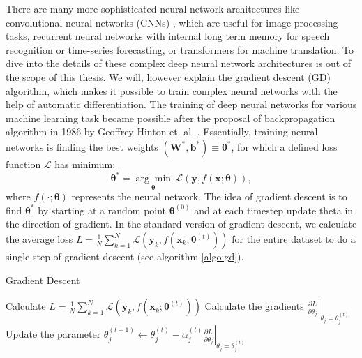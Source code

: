 \documentclass[12pt, a4paper,  nobibnotes]{article}
\begin{document}
There are many more sophisticated neural network architectures like convolutional neural networks (CNNs)
\cite{LeCun-CNN}, which are useful for image processing tasks, recurrent neural networks 
with internal long term memory \cite{SchmidhuberLSTM} for speech recognition or time-series 
forecasting, or transformers \cite{Transformer} for machine translation. 
To dive into the details of these complex deep neural network architectures is out of the 
scope of this thesis. 
We will, however explain the gradient descent (GD) algorithm, which makes it possible to train 
complex neural networks with the help of automatic differentiation.
The training of deep neural networks for various machine learning task
became possible after the proposal of backpropagation algorithm in 1986 by 
Geoffrey Hinton et. al. \cite{BackpropPaper}.
Essentially, training neural networks is finding the best weights $(\mathbf W^*, \mathbf b^*)\equiv
\pmb\theta^*$, for which a defined loss function $\mathcal L$ has minimum:
\begin{equation}
    \pmb\theta^* = \underset{\pmb\theta}{\arg\min}\,\mathcal L (\mathbf y, f(\mathbf x; \pmb\theta)),
\end{equation}
where $f(\cdot; \pmb\theta)$ represents the neural network. The idea of gradient descent is 
to find $\pmb\theta^*$ by starting at a random point $\pmb\theta^{(0)}$ and at each timestep
update theta in the direction of gradient. In the standard version of gradient-descent, 
we calculate the average loss $L = \frac{1}{N}\sum\limits_{k=1}^N \mathcal L(\mathbf y_k, f(\mathbf x_k; \pmb\theta^{(t)}))$
for the entire dataset to do a single step of gradient descent (see algorithm \ref{algo:gd}).
\begin{algorithm}[H]
    \caption{Gradient Descent}
    \begin{algorithmic}[1]
            \State Calculate $L = \frac{1}{N}\sum\limits_{k=1}^N \mathcal L(\mathbf y_k, f(\mathbf x_k; \pmb\theta^{(t)}))$ 
                \State Calculate the gradients $ \left. \frac{\partial L}{\partial \theta_j} \right|_{\theta_j = \theta_j^{(t)}}$
                \State Update the parameter $\theta_j^{(t+1)} \leftarrow \theta_j^{(t)} - \alpha_j^{(t)} \left. \frac{\partial L}{\partial \theta_j} \right|_{\theta_j = \theta_j^{(t)}}$
            \EndFor
        \EndFor
    \EndProcedure
    \end{algorithmic}
    \label{algo:gd}
\end{algorithm}
\end{document}
